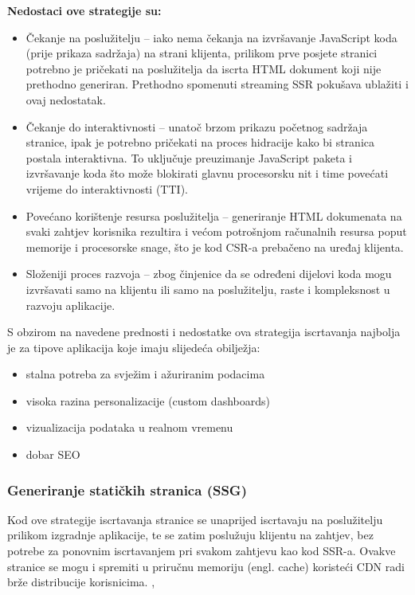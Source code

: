 \bigskip

\textbf{Nedostaci ove strategije su:}

\begin{itemize}
    \item Čekanje na poslužitelju – iako nema čekanja na izvršavanje JavaScript ko\-da (prije prikaza sadržaja) na strani klijenta, prilikom prve posjete stranici potrebno je pričekati na poslužitelja da iscrta HTML dokument koji nije prethodno generiran. Prethodno spomenuti streaming SSR pokušava ublažiti i ovaj nedostatak.
    \item Čekanje do interaktivnosti – unatoč brzom prikazu početnog sadržaja stranice, ipak je potrebno pričekati na proces hidracije kako bi stranica postala interaktivna. To uključuje preuzimanje JavaScript paketa i izvršavanje koda što može blokirati glavnu procesorsku nit i time povećati vrijeme do interaktivnosti (TTI).
    \item Povećano korištenje resursa poslužitelja – generiranje HTML dokumenata na svaki zahtjev korisnika rezultira i većom potrošnjom računalnih resursa poput memorije i procesorske snage, što je kod CSR-a prebačeno na uređaj klijenta.
    \item Složeniji proces razvoja – zbog činjenice da se određeni dijelovi koda mogu izvršavati samo na klijentu ili samo na poslužitelju, raste i kompleksnost u razvoju aplikacije. \cite{beran2023usporedba}
\end{itemize}

S obzirom na navedene prednosti i nedostatke ova strategija iscrtavanja najbolja je za tipove aplikacija koje imaju slijedeća obilježja: \cite{moore2024rendering}
\begin{itemize}
    \item stalna potreba za svježim i ažuriranim podacima
    \item visoka razina personalizacije (custom dashboards)
    \item vizualizacija podataka u realnom vremenu
    \item dobar SEO
\end{itemize}

\subsubsection{Generiranje statičkih stranica (SSG)}

Kod ove strategije iscrtavanja stranice se unaprijed iscrtavaju na poslužitelju prilikom izgradnje aplikacije, te se zatim poslužuju klijentu na zahtjev, bez potrebe za ponovnim iscrtavanjem pri svakom zahtjevu kao kod SSR-a. Ovakve stranice se mogu i spremiti u priručnu memoriju (engl. cache) koristeći CDN radi brže distribucije korisnicima. \cite{nextjsssg}, \cite{sanityssg}

